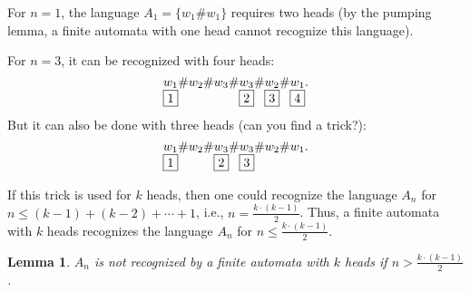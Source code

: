 \documentclass[12pt,sans]{article}
\theoremstyle{definition}
\theoremstyle{plain}
\newtheorem{lemma}{Lemma}[section]
\theoremstyle{remark}
\begin{document}
For $n = 1$, the language $A_1 = \{w_1\#w_1\}$ requires two heads (by the pumping lemma, a finite automata with one head cannot recognize this language).

For $n = 3$, it can be recognized with four heads:
\[
\underset{\fbox{1}}{w_1}\#w_2\#w_3\#\underset{\fbox{2}}{w_3}\#\underset{\fbox{3}}{w_2}\#\underset{\fbox{4}}{w_1}.
\]
But it can also be done with three heads (can you find a trick?):
\[
\underset{\fbox{1}}{w_1}\#w_2\#\underset{\fbox{2}}{w_3}\#\underset{\fbox{3}}{w_3}\#w_2\#w_1.
\]

If this trick is used for $k$ heads, then one could recognize the language $A_n$ for $n \le (k-1) + (k-2) + \dotsb + 1$, i.e., $n = \frac{k \cdot (k-1)}{2}$. Thus, a finite automata with $k$ heads recognizes the language $A_n$ for $n \le \frac{k \cdot (k-1)}{2}$.

\begin{lemma}
    $A_n$ is not recognized by a finite automata with $k$ heads if $n > \frac{k \cdot (k-1)}{2}$.
\end{lemma}
\end{document}
